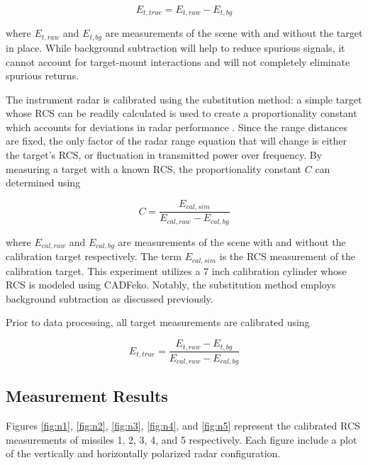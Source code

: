     \begin{equation}
      E_{t, true} = E_{t, raw} - E_{t, bg}
    \end{equation}

    where $E_{t, raw}$ and $E_{t, bg}$ are measurements of the scene with and without the target in place. While background subtraction will help to reduce spurious signals, it cannot account for target-mount interactions and will not completely eliminate spurious returns.

    The instrument radar is calibrated using the substitution method:  a simple target whose RCS can be readily calculated is used to create a proportionality constant which accounts for deviations in radar performance \cite{Knott}. Since the range distances are fixed, the only factor of the radar range equation that will change is either the target's RCS, or fluctuation in transmitted power over frequency. By measuring a target with a known RCS, the proportionality constant $C$ can determined using

    \begin{equation}
      C = \frac{E_{cal, sim}}{E_{cal, raw} - E_{cal, bg}}
    \end{equation}

    where $E_{cal, raw}$ and $E_{cal, bg}$ are measurements of the scene with and without the calibration target respectively. The term $E_{cal, sim}$ is the RCS measurement of the calibration target. This experiment utilizes a 7 inch calibration cylinder whose RCS is modeled using CADFeko. Notably, the substitution method employs background subtraction as discussed previously.

    Prior to data processing, all target measurements are calibrated using

    \begin{equation}
      E_{t, true} = \frac{E_{t, raw} - E_{t, bg}}{E_{cal, raw} - E_{cal, bg}}
    \end{equation}

  \subsection{Measurement Results}

    Figures \ref{fig:n1}, \ref{fig:n2}, \ref{fig:n3}, \ref{fig:n4}, and \ref{fig:n5} represent the calibrated RCS measurements of missiles 1, 2, 3, 4, and 5 respectively. Each figure include a plot of the vertically and horizontally polarized radar configuration.

